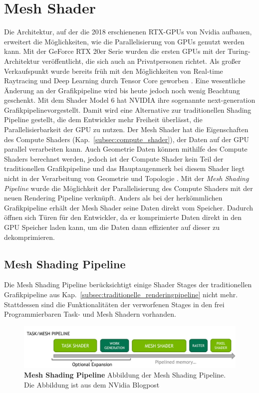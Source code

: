 \section{Mesh Shader}
Die Architektur, auf der die 2018 erschienenen RTX-GPUs von Nvidia aufbauen, erweitert die Möglichkeiten, wie die Parallelisierung von GPUs genutzt werden kann.
Mit der GeForce RTX 20er Serie wurden die ersten GPUs mit der Turing-Architektur veröffentlicht, die sich auch an Privatpersonen richtet.
Als großer Verkaufspunkt wurde bereits früh mit den Möglichkeiten von Real-time Raytracing und Deep Learning durch Tensor Core geworben \cite{Burgess2020}. 
Eine wesentliche Änderung an der Grafikpipeline wird bis heute jedoch noch wenig Beachtung geschenkt.
Mit dem Shader Model 6 hat NVIDIA ihre sogenannte \glqq next-generation Grafikpipeline\grqq vorgestellt.
Damit wird eine Alternative zur traditionellen Shading Pipeline gestellt, die dem Entwickler mehr Freiheit überlässt, die Parallelisierbarkeit der GPU zu nutzen.
Der Mesh Shader hat die Eigenschaften des Compute Shaders (Kap.~\ref{subsec:compute_shader}), der Daten auf der GPU parallel verarbeiten kann.
Auch Geometrie Daten können mithilfe des Compute Shaders berechnet werden, jedoch ist der Compute Shader kein Teil der traditionellen Grafikpipeline und das Hauptaugenmerk bei diesem Shader liegt nicht in der Verarbeitung von Geometrie und Topologie \cite{Ilett2022}.
Mit der \textit{Mesh Shading Pipeline} wurde die Möglichkeit der Parallelisierung des Compute Shaders mit der neuen Rendering Pipeline verknüpft.
Anders als bei der herkömmlichen Grafikpipeline erhält der Mesh Shader seine Daten direkt vom Speicher. 
Dadurch öffnen sich Türen für den Entwickler, da er komprimierte Daten direkt in den GPU Speicher laden kann, um die Daten dann effizienter auf dieser zu dekomprimieren.

\subsection{Mesh Shading Pipeline}
\label{subsec:meshshading_pipeline}
Die Mesh Shading Pipeline berücksichtigt einige Shader Stages der traditionellen Grafikpipeline aus Kap.~\ref{subsec:traditionelle_renderingpipeline} nicht mehr.
Stattdessen sind die Funktionalitäten der verworfenen Stages in den frei Programmierbaren Task- und Mesh Shadern vorhanden.
\begin{figure}[htb]
  \centering  
  \includegraphics[scale=0.43]{Bilder/Mesh_shading_pipeline.jpg}
  \caption[Mesh Shading Pipeline]{\textbf{Mesh Shading Pipeline} Abbildung der Mesh Shading Pipeline.
  Die Abbildung ist aus dem NVidia Blogpost \cite{Kubisch2018} }
  \label{fig:mesh_shading_pipeline}
\end{figure}

